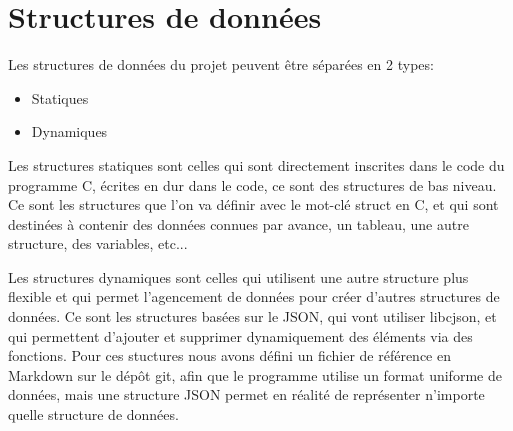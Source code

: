% 
\section{Structures de données}
Les structures de données du projet peuvent être séparées en 2 types:
\begin{itemize}
	\item Statiques
	\item Dynamiques
\end{itemize}
Les structures statiques sont celles qui sont directement inscrites dans le code du programme C, écrites en dur dans le code, ce sont des structures de bas niveau. Ce sont les structures que l'on va définir avec le mot-clé struct en C, et qui sont destinées à contenir des données connues par avance, un tableau, une autre structure, des variables, etc...\par
Les structures dynamiques sont celles qui utilisent une autre structure plus flexible et qui permet l'agencement de données pour créer d'autres structures de données. Ce sont les structures basées sur le JSON, qui vont utiliser libcjson, et qui permettent d'ajouter et supprimer dynamiquement des éléments via des fonctions. Pour ces stuctures nous avons défini un fichier de référence en Markdown sur le dépôt git, afin que le programme utilise un format uniforme de données, mais une structure JSON permet en réalité de représenter n'importe quelle structure de données.\par
% 
